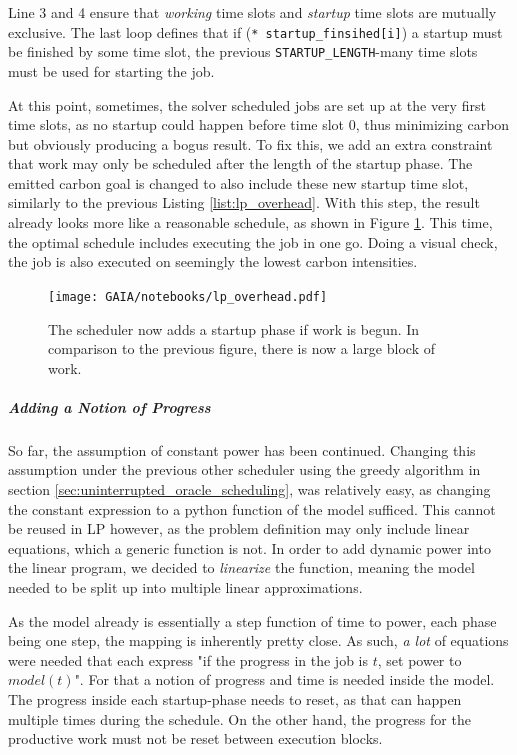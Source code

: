 Line 3 and 4 ensure that \emph{working} time slots and \emph{startup} time slots are mutually exclusive.
The last loop defines that if (\verb|* startup_finsihed[i]|) a startup must be finished by some time slot, the previous \verb|STARTUP_LENGTH|-many time slots must be used for starting the job.

At this point, sometimes, the solver scheduled jobs are set up at the very first time slots, as no startup could happen before time slot $0$, thus minimizing carbon but obviously producing a bogus result.
To fix this, we add an extra constraint that work may only be scheduled after the length of the startup phase.
The emitted carbon goal is changed to also include these new startup time slot, similarly to the previous Listing \ref{list:lp_overhead}.
With this step, the result already looks more like a reasonable schedule, as shown in Figure \ref{fig:lp_overhead}. 
This time, the optimal schedule includes executing the job in one go.
Doing a visual check, the job is also executed on seemingly the lowest carbon intensities.

\begin{figure}
    \texttt{[image: GAIA/notebooks/lp\_overhead.pdf]}
    \caption{The scheduler now adds a startup phase if work is begun. In comparison to the previous figure, there is now a large block of work.}
    \label{fig:lp_overhead}
\end{figure}

\subparagraph{Adding a Notion of Progress}

So far, the assumption of constant power has been continued.
Changing this assumption under the previous other scheduler using the greedy algorithm in section \ref{sec:uninterrupted_oracle_scheduling}, was relatively easy, as changing the constant expression to a python function of the model sufficed. 
This cannot be reused in LP however, as the problem definition may only include linear equations, which a generic function is not. 
In order to add dynamic power into the linear program, we decided to \emph{linearize} the function, meaning the model needed to be split up into multiple linear approximations.

As the model already is essentially a step function of time to power, each phase being one step, the mapping is inherently pretty close. 
As such, \emph{a lot} of equations were needed that each express "if the progress in the job is $t$, set power to $model(t)$". 
For that a notion of progress and time is needed inside the model.
The progress inside each startup-phase needs to reset, as that can happen multiple times during the schedule. 
On the other hand, the progress for the productive work must not be reset between execution blocks. 


